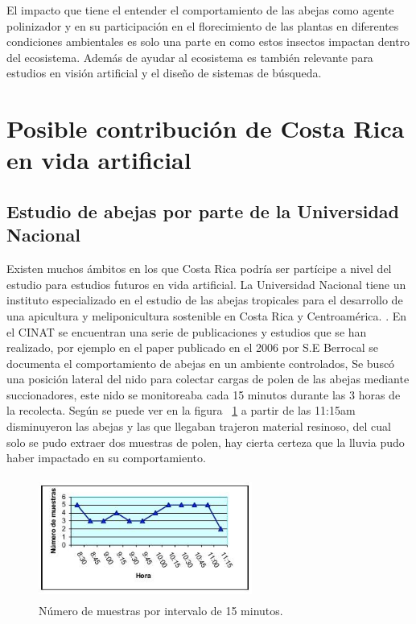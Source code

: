 \documentclass[conference]{IEEEtran}
\begin{document}
El impacto que tiene el entender el comportamiento de las abejas como agente polinizador y en su participaci\'on en el florecimiento de las plantas en diferentes condiciones ambientales es solo una parte en como estos insectos impactan dentro del ecosistema. Adem\'as de ayudar al ecosistema es tambi\'en relevante para estudios en visi\'on artificial y el dise\~no de sistemas de b\'usqueda. \cite{ZOE01}

\section{Posible contribuci\'on de Costa Rica en vida artificial}

\subsection{Estudio de abejas por parte de la Universidad Nacional}
Existen muchos \'ambitos en los que Costa Rica podr\'ia ser part\'icipe a nivel del estudio para estudios futuros en vida artificial. La Universidad Nacional tiene un instituto especializado en el estudio de las abejas tropicales para el desarrollo de una apicultura y meliponicultura sostenible en Costa Rica y Centroam\'erica. \cite{CINAT} . En el CINAT se encuentran una serie de publicaciones y estudios que se han realizado, por ejemplo en el paper publicado en el 2006 por S.E Berrocal se documenta el comportamiento de abejas en un ambiente controlados, Se busc\'o una posici\'on lateral del nido para colectar cargas de polen de las abejas mediante succionadores, este nido se monitoreaba cada 15 minutos durante las 3 horas de la recolecta. Seg\'un se puede ver en la figura ~\ref{fig:muestra} a partir de las 11:15am disminuyeron las abejas y las que llegaban trajeron material resinoso, del cual solo se pudo extraer dos muestras de polen, hay cierta certeza que la lluvia pudo haber impactado en su comportamiento.\cite{APICOLA}
\begin{figure}[ht]
  \includegraphics[width=7cm,height=4cm]{img/muestras.jpg}
  \caption{N\'umero de muestras por intervalo de 15 minutos. \cite{APICOLA}}
  \label{fig:muestra}
\end{figure}
\end{document}
